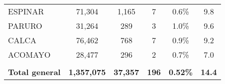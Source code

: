 \begin{tabular}{lccccc}
	\cellcolor[HTML]{FFFF99}ESPINAR                                 & 71,304               & 1,165                                & 7                    & 0.6\%                      & 9.8                                         \\
	\cellcolor[HTML]{FFFF99}PARURO                                  & 31,264               & 289                                  & 3                    & 1.0\%                      & 9.6                                         \\
	\cellcolor[HTML]{FFFF99}CALCA                                   & 76,462               & 768                                  & 7                    & 0.9\%                      & 9.2                                         \\
	\cellcolor[HTML]{FFFF99}ACOMAYO                                 & 28,477               & 296                                  & 2                    & 0.7\%                      & 7.0                                         \\
	& \multicolumn{1}{l}{} & \multicolumn{1}{l}{}                 & \multicolumn{1}{l}{} & \multicolumn{1}{l}{}       & \multicolumn{1}{l}{}                        \\
	\rowcolor[HTML]{DDEBF7} 
	\textbf{Total general}                                          & \textbf{1,357,075}   & \textbf{37,357}                      & \textbf{196}         & \textbf{0.52\%}            & \textbf{14.4}                              
\end{tabular}